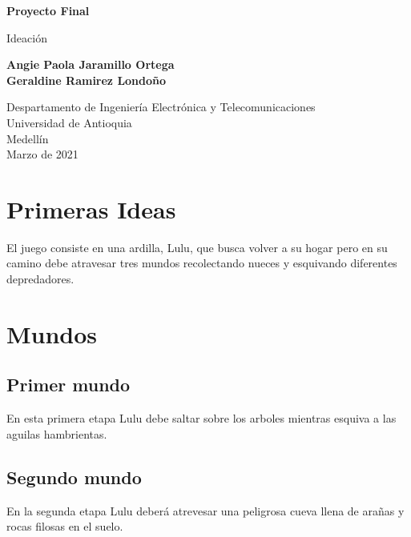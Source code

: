 \documentclass{article}
\begin{document}
\begin{titlepage}
    \begin{center}
        \vspace*{1cm}
            
        \Huge
        \textbf{Proyecto Final}
            
        \vspace{0.5cm}
        \LARGE
        Ideación
            
        \vspace{1.5cm}
            
        \textbf{Angie Paola Jaramillo Ortega}\\
        \textbf{Geraldine Ramirez Londoño}
            
        \vfill
            
        \vspace{0.8cm}
            
        \Large
        Despartamento de Ingeniería Electrónica y Telecomunicaciones\\
        Universidad de Antioquia\\
        Medellín\\
        Marzo de 2021
            
    \end{center}
\end{titlepage}

\newpage
\section{Primeras Ideas}
El juego consiste en una ardilla, Lulu, que busca volver a su hogar pero en su camino debe atravesar tres mundos recolectando nueces y esquivando diferentes depredadores.

\section{Mundos}
\subsection{Primer mundo}
En esta primera etapa Lulu debe saltar sobre los arboles mientras esquiva a las aguilas hambrientas.

\subsection{Segundo mundo}
En la segunda etapa Lulu deberá atrevesar una peligrosa cueva llena de arañas y rocas filosas en el suelo.
\end{document}

